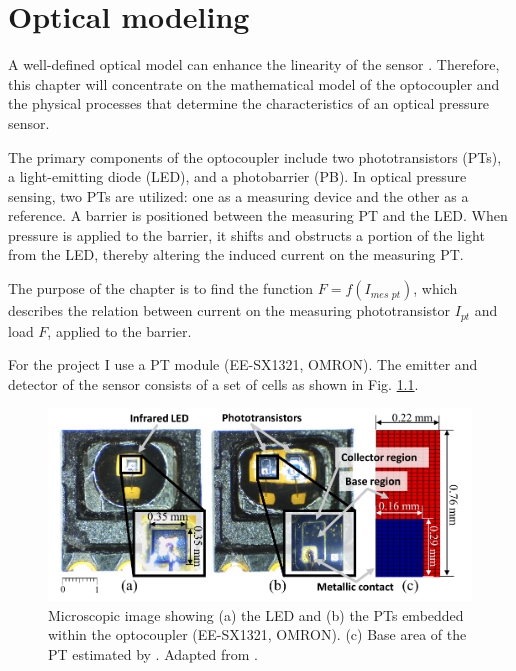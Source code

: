 \chapter{Optical modeling}
\label{chapter:optical_modeling}
A well-defined optical model can enhance the linearity of the sensor \cite{my_love_pressure_photosensor}. Therefore, this chapter will concentrate on the mathematical model of the optocoupler and the physical processes that determine the characteristics of an optical pressure sensor.

The primary components of the optocoupler include two phototransistors (PTs), a light-emitting diode (LED), and a photobarrier (PB). 
In optical pressure sensing, two PTs are utilized: one as a measuring device and the other as a reference. 
A barrier is positioned between the measuring PT and the LED. 
When pressure is applied to the barrier, it shifts and obstructs a portion of the light from the LED, thereby altering the induced current on the measuring PT.

The purpose of the chapter is to find the function $F = f(I_{\textit{mes pt}})$, which describes the relation between current on the measuring phototransistor $I_{pt}$ and load $F$, applied to the barrier.

For the project I use a PT module (EE-SX1321, OMRON). 
The emitter and detector of the sensor consists of a set of cells as shown in Fig. \ref*{fig:microscopic_image}.

\begin{figure}[H]
  \includegraphics[width=\textwidth]{figs/Microscopic_image.png}
    \centering
    \caption{ Microscopic image showing (a) the LED and (b) the PTs embedded within the optocoupler (EE-SX1321, OMRON). 
    (c) Base area of the PT estimated by \cite[Fig. 4]{my_love_pressure_photosensor}.
    Adapted from \cite[Fig. 4]{my_love_pressure_photosensor}.}
    \label{fig:microscopic_image}
\end{figure}


